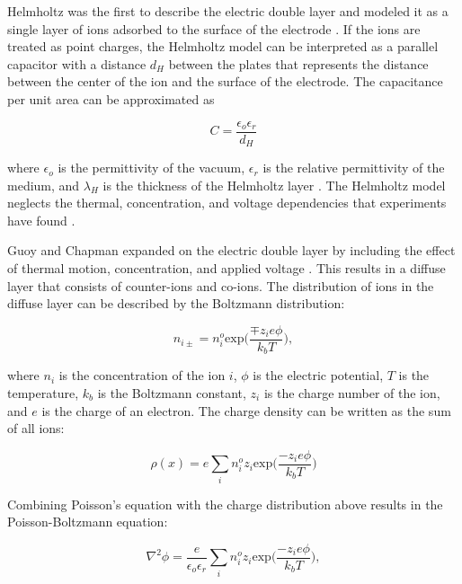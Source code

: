 \par Helmholtz was the first to describe the electric double layer and modeled it as a single layer of ions adsorbed to the surface of the electrode \cite{ishai_electrode_2013}. If the ions are treated as point charges, the Helmholtz model can be interpreted as a parallel capacitor with a distance $d_H$ between the plates that represents the distance between the center of the ion and the surface of the electrode. The capacitance per unit area can be approximated as

\begin{equation}
    C = \frac{\epsilon_o\epsilon_r}{d_H}
\end{equation}

\noindent where $\epsilon_o$ is the permittivity of the vacuum, $\epsilon_r$ is the relative permittivity of the medium, and $\lambda_H$ is the thickness of the Helmholtz layer \cite{_gongadze.pdf_????}. The Helmholtz model neglects the thermal, concentration, and voltage dependencies that experiments have found \cite{_jes2011.pdf_????}.

\par Guoy and Chapman expanded on the electric double layer by including the effect of thermal motion, concentration, and applied voltage \cite{gongadze-2,3}. This results in a diffuse layer that consists of counter-ions and co-ions. The distribution of ions in the diffuse layer can be described by the Boltzmann distribution:

\begin{equation}
    n_{i\pm} = n_i^o \text{exp}\Big(\frac{ \mp z_i e\phi}{k_b T}\Big),
\end{equation}

\noindent where $n_i$ is the concentration of the ion $i$, $\phi$ is the electric potential, $T$ is the temperature, $k_b$ is the Boltzmann constant, $z_i$ is the charge number of the ion, and $e$ is the charge of an electron. The charge density can be written as the sum of all ions:

\begin{equation}
    \rho(x) = e \sum_i n_i^o z_i \text{exp}\Big(\frac{-z_i e\phi}{k_b T}\Big)
\end{equation}

\par Combining Poisson's equation with the charge distribution above results in the Poisson-Boltzmann equation:

\begin{equation}
    \nabla^2\phi = \frac{e}{\epsilon_o\epsilon_r} \sum_i n_i^o z_i \text{exp}\Big(\frac{-z_i e \phi}{k_b T}\Big),
\end{equation}

